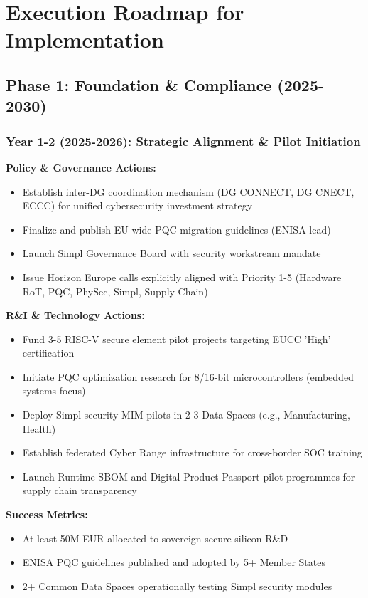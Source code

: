 \documentclass[12pt,a4paper]{report}
\begin{document}
\newpage
\section{Execution Roadmap for Implementation}

\subsection*{Phase 1: Foundation \& Compliance (2025-2030)}

\subsubsection*{Year 1-2 (2025-2026): Strategic Alignment \& Pilot Initiation}
\textbf{Policy \& Governance Actions:}
\begin{itemize}
    \item Establish inter-DG coordination mechanism (DG CONNECT, DG CNECT, ECCC) for unified cybersecurity investment strategy
    \item Finalize and publish EU-wide PQC migration guidelines (ENISA lead)
    \item Launch Simpl Governance Board with security workstream mandate
    \item Issue Horizon Europe calls explicitly aligned with Priority 1-5 (Hardware RoT, PQC, PhySec, Simpl, Supply Chain)
\end{itemize}

\textbf{R\&I \& Technology Actions:}
\begin{itemize}
    \item Fund 3-5 RISC-V secure element pilot projects targeting EUCC 'High' certification
    \item Initiate PQC optimization research for 8/16-bit microcontrollers (embedded systems focus)
    \item Deploy Simpl security MIM pilots in 2-3 Data Spaces (e.g., Manufacturing, Health)
    \item Establish federated Cyber Range infrastructure for cross-border SOC training
    \item Launch Runtime SBOM and Digital Product Passport pilot programmes for supply chain transparency
\end{itemize}

\textbf{Success Metrics:}
\begin{itemize}
    \item At least 50M EUR allocated to sovereign secure silicon R\&D
    \item ENISA PQC guidelines published and adopted by 5+ Member States
    \item 2+ Common Data Spaces operationally testing Simpl security modules
\end{itemize}
\end{document}
